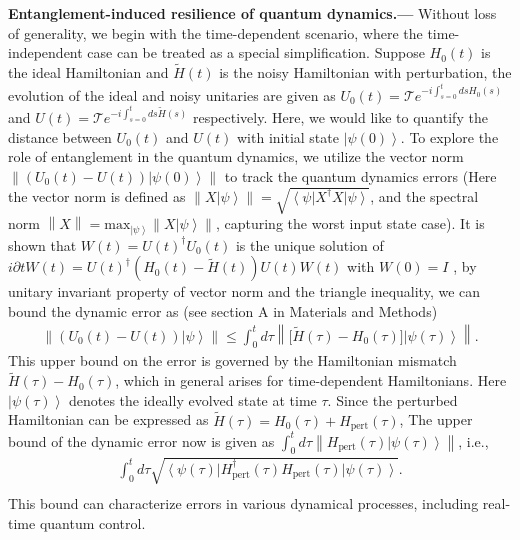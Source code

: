 \documentclass[12pt]{article}
\newcommand{\ket}[1]{\left|#1\right\rangle}
\newcommand{\bra}[1]{\left\langle #1\right|}
\newcommand{\norm}[1]{\left\lVert #1\right\rVert}
\begin{document}
\noindent\textbf{Entanglement-induced resilience of quantum dynamics.---} 
Without loss of generality, we begin with the time-dependent scenario, where the time-independent case can be treated as a special simplification.  
Suppose $H_0(t)$ is the ideal Hamiltonian and $\widetilde{H}(t)$ is the noisy Hamiltonian with perturbation, the evolution of the ideal and noisy unitaries are given as $U_0(t)=\mathcal{T} e^{-i\int_{s=0}^{t}d{s}H_0(s)}$ and  $U(t)=\mathcal{T} e^{-i\int_{s=0}^{t}d{s}\widetilde{H}(s)}$ respectively.
Here, we would like to quantify the distance between $U_0(t)$ and $U(t)$ with initial state $\ket{\psi(0)}$. 
To explore the role of entanglement in the quantum dynamics, 
we utilize the vector norm $\norm{(U_0(t)-U(t))\ket{\psi(0)}}$ to track the quantum dynamics errors (Here the vector norm is defined as $\norm{X\ket{\psi}}=\sqrt{\bra{\psi}X^\dagger X\ket{\psi}}$, and the spectral norm $\norm{X}=\text{max}_{\ket{\psi}}\norm{X\ket{\psi}}$, capturing the worst input state case).  
It is shown that $W(t)=U(t)^\dagger U_0(t)$ is the unique solution of $ i \partial t W(t) =U (t)^\dagger (H_0(t)-\widetilde{H}(t))U(t ) W(t)$ with $W(0)=I$ \cite{HHKL8555119,doi:10.1126/science.1121541}, by unitary invariant property of vector norm and the triangle inequality, we can bound the dynamic error as (see section A in Materials and Methods)
\begin{equation}
\begin{split}
\label{maineq2}
    \norm{(U_0(t)-U(t))\ket{\psi}} \le\int_0 ^t d\tau \norm{\big[  \widetilde{H}(\tau)-H_0(\tau)\big]\ket{\psi(\tau)}}.
        \end{split}
\end{equation}
This upper bound on the error is governed by the Hamiltonian mismatch $\widetilde{H}(\tau)-H_0(\tau)$, which in general arises for time-dependent Hamiltonians. Here $\ket{\psi(\tau)}$ denotes the ideally evolved state at time $\tau$. 
Since the perturbed Hamiltonian can be expressed as
$\widetilde{H}(\tau)=H_0(\tau)+H_{\text{pert}}(\tau)$, 
The upper bound of the dynamic error now is given as $\int_0 ^t d\tau \norm{ H_{\text{pert}}(\tau) \ket{\psi(\tau)}}$, i.e.,
\begin{equation}
\label{Eq:maineq}
\begin{split}
         \int_0 ^t d\tau \sqrt{\bra{\psi(\tau)} H_{\text{pert}}^\dagger (\tau)H_{\text{pert}}(\tau) \ket{\psi(\tau)}}.\\
\end{split}
\end{equation}
This bound can characterize errors in various dynamical processes, including real-time quantum control. 
\end{document}
